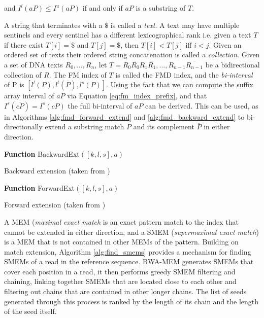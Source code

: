 and $I^l(aP)\le I^u(aP)$ if and only if $aP$ is a substring of $T$.

A string that terminates with a $\$$ is called a \emph{text}. A text may have multiple sentinels and every sentinel has a different lexicographical rank i.e. given a text $T$ if there exist $T[i]=\$$ and $T[j]=\$$, then $T[i] < T[j]$ iff $i<j$. Given an ordered set of texts their ordered string concatenation is called a \emph{collection}. Given a set of DNA texts $R_0,\dots,R_n$, let $T=R_0\overline{R_0}R_1\overline{R_1},\dots,R_{n-1}\overline{R_{n-1}}$ be a {bidirectional collection} of $R$. The FM index of $T$ is called the FMD index, and the \emph{bi-interval} of P is $[l^l(P),l^l(\overline{P}), l^s(P)]$. Using the fact that we can compute the suffix array interval of $aP$ via Equation \ref{eq:fm_index_prefix}, and that $I^s(\overline{cP})=I^s(cP)$ the full bi-interval of $aP$ can be derived. This can be used, as in Algorithms \ref{alg:fmd_forward_extend} and \ref{alg:fmd_backward_extend} to bi-directionally extend a substring match $P$ and its complement $\overline{P}$ in either direction.

\begin{algorithm2e}[h]
\DontPrintSemicolon
\footnotesize
{}
\BlankLine
\textbf{Function} {\sc BackwardExt}$([k,l,s],a)$
\caption{Backward extension (taken from \autocite{li2012exploring})}
\label{alg:fmd_backward_extend}
\end{algorithm2e}

\begin{algorithm2e}[h]
\DontPrintSemicolon
\footnotesize
{}
\BlankLine
\textbf{Function} {\sc ForwardExt}$([k,l,s],a)$
\caption{Forward extension (taken from \autocite{li2012exploring})}
\label{alg:fmd_forward_extend}
\end{algorithm2e}

A MEM (\emph{maximal exact match} is an exact pattern match to the index that cannot be extended in either direction, and a SMEM (\emph{supermaximal exact match}) is a MEM that is not contained in other MEMs of the pattern. Building on match extension, Algorithm \ref{alg:find_smems}\autocite{li2012exploring} provides a mechanism for finding SMEMs of a read in the reference sequence. BWA-MEM generates SMEMs that cover each position in a read, it then performs greedy SMEM filtering and chaining, linking together SMEMs that are located close to each other and filtering out chains that are contained in other longer chains. The list of seeds generated through this process is ranked by the length of its chain and the length of the seed itself. 

